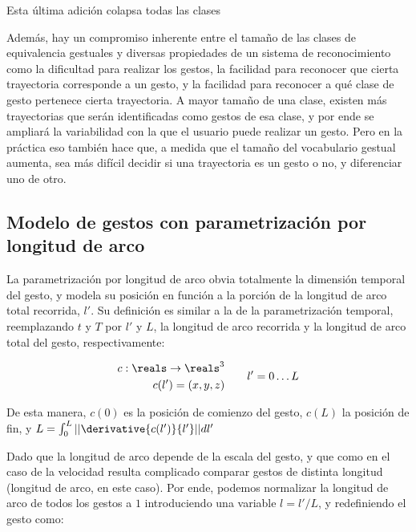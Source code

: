 Esta última adición colapsa todas las clases

Además, hay un compromiso inherente entre el tamaño de las clases de equivalencia gestuales y diversas propiedades de un sistema de reconocimiento como la dificultad para realizar los gestos, la facilidad para reconocer que cierta trayectoria corresponde a un gesto, y la facilidad para reconocer a qué clase de gesto pertenece cierta trayectoria. A mayor tamaño de una clase, existen más trayectorias que serán identificadas como gestos de esa clase, y por ende se ampliará la variabilidad con la que el usuario puede realizar un gesto. Pero en la práctica eso también hace que, a medida que el tamaño del vocabulario gestual aumenta, sea más difícil decidir si una trayectoria es un gesto o no, y diferenciar uno de otro.



\subsection{Modelo de gestos con parametrización por longitud de arco}

La parametrización por longitud de arco obvia totalmente la dimensión temporal del gesto, y modela su posición en función a la porción de la longitud de arco total recorrida, $l'$. Su definición es similar a la de la parametrización temporal, reemplazando $t$ y $T$ por $l'$ y $L$, la longitud de arco recorrida y la longitud de arco total del gesto, respectivamente:

\begin{equation}
  \begin{split}
    c : \reals \rightarrow \reals^3 \\
    c(l')=(x,y,z)
  \end{split}
  \quad \quad
  \begin{split}
    l'=0 \dots L
  \end{split}
\end{equation} 

De esta manera, $c(0)$ es la posición de comienzo del gesto, $c(L)$ la posición de fin, y $L=\int_0^L || \derivative{c(l')}{l'}|| dl'$

Dado que la longitud de arco depende de la escala del gesto, y que como en el caso de la velocidad resulta complicado comparar gestos de distinta longitud (longitud de arco, en este caso). Por ende, podemos normalizar la longitud de arco de todos los gestos a $1$ introduciendo una variable $l=l'/L$, y redefiniendo el gesto como:

